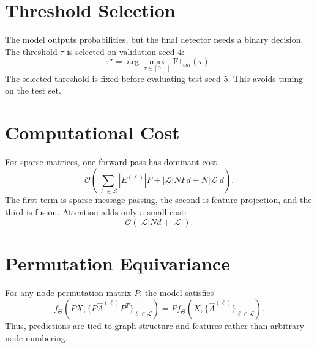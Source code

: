 \documentclass[10pt]{article}
\begin{document}
\section{Threshold Selection}
The model outputs probabilities, but the final detector needs a binary decision. The threshold $\tau$ is selected on validation seed 4:
\begin{equation}
\tau^\star=
\arg\max_{\tau\in[0,1]}
\mathrm{F1}_{val}(\tau).
\label{eq:app2_threshold}
\end{equation}
The selected threshold is fixed before evaluating test seed 5. This avoids tuning on the test set.

\section{Computational Cost}
For sparse matrices, one forward pass has dominant cost
\begin{equation}
\mathcal{O}\left(
\sum_{\ell\in\mathcal{L}} |E^{(\ell)}|F
+|\mathcal{L}|NFd
+N|\mathcal{L}|d
\right).
\label{eq:app2_complexity}
\end{equation}
The first term is sparse message passing, the second is feature projection, and the third is fusion. Attention adds only a small cost:
\begin{equation}
\mathcal{O}(|\mathcal{L}|Nd+|\mathcal{L}|).
\label{eq:app2_attention_cost}
\end{equation}

\section{Permutation Equivariance}
For any node permutation matrix $P$, the model satisfies
\begin{equation}
f_\Theta(PX,\{P\hat{A}^{(\ell)}P^T\}_{\ell\in\mathcal{L}})
=P f_\Theta(X,\{\hat{A}^{(\ell)}\}_{\ell\in\mathcal{L}}).
\label{eq:app2_equivariance}
\end{equation}
Thus, predictions are tied to graph structure and features rather than arbitrary node numbering.
\end{document}
